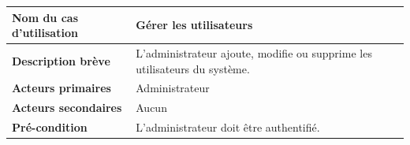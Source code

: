 \begin{table}[H]
	\centering
	\renewcommand{\arraystretch}{1.5}
	\small
	
	\begin{tabularx}{\textwidth}{|p{4.5cm}|X|}
		\hline
		\rowcolor{blue!20}
		\textbf{Nom du cas d’utilisation}
		& Gérer les utilisateurs \\ \hline
		
		\textbf{Description brève}
		& L’administrateur ajoute, modifie ou supprime les utilisateurs du système. \\ \hline
		
		\textbf{Acteurs primaires}
		& Administrateur \\ \hline
		
		\textbf{Acteurs secondaires}
		& Aucun \\ \hline
		
		\textbf{Pré-condition}
		& L’administrateur doit être authentifié. \\ \hline
		

\end{tabularx}
\end{table}
